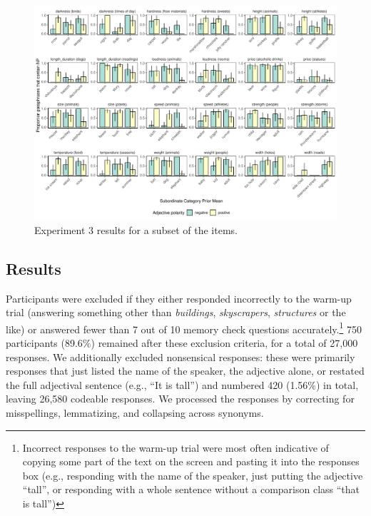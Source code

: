 \documentclass[doc]{apa6}
\begin{document}
\begin{figure}[t!]
\centering
\includegraphics[width=\textwidth]{figs/bars_cc_finalExpt_pilot_byItem.pdf}
\caption{Experiment 3 results for a subset of the items.}\label{fig:ccInferenceItems}
\end{figure}


\subsection{Results}

Participants were excluded if they either responded incorrectly to the warm-up trial (answering something other than \emph{buildings}, \emph{skyscrapers}, \emph{structures} or the like) or answered fewer than 7 out of 10 memory check questions accurately.\footnote{Incorrect responses to the warm-up trial were most often indicative of copying some part of the text on the screen and pasting it into the responses box (e.g., responding with the name of the speaker, just putting the adjective ``tall'', or responding with a whole sentence without a comparison class ``that is tall'')}
750 participants (89.6\%) remained after these exclusion criteria, for a total of 27,000 responses.
We additionally excluded nonsensical responses: these were primarily responses that just listed the name of the speaker, the adjective alone, or restated the full adjectival sentence (e.g., ``It is tall'') and numbered 420 (1.56\%) in total, leaving 26,580 codeable responses. 
We processed the responses by correcting for misspellings, lemmatizing, and collapsing across synonyms. 
\end{document}
